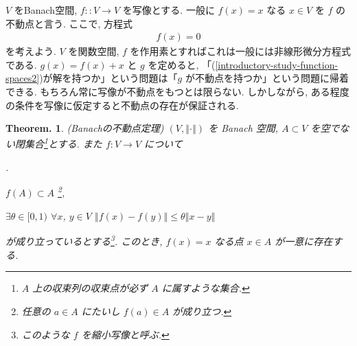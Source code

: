 \documentclass[openany, a4paper, oneside]{jsbook}
\newcounter{enum2}
\renewenvironment{enumerate}{%
\begin{list}%
{%
\arabic{enum2}.\ \,%
}%
{%
\usecounter{enum2}
\setlength{\itemindent}{0pt}%
\setlength{\leftmargin}{15pt}%
\setlength{\rightmargin}{0pt}%
\setlength{\labelsep}{0pt}%
\setlength{\labelwidth}{6pt}%
\setlength{\itemsep}{0pt}%
\setlength{\parsep}{0pt}%
\setlength{\listparindent}{0pt}%
}
}{%
\end{list}%
}
\theoremstyle{break}
\theoremstyle{breakdefn}
\newtheorem{thm}{Theorem.}[section]
\newcommand{\norm}[1]{\left\Vert#1\right\Vert}
\begin{document}
$V$ をBanach空間, $f \colon :V \to V$ を写像とする.
一般に $f(x)=x$ なる $x\in V$ を $f$ の不動点と言う.
ここで, 方程式
\begin{align}
 f(x)=0 \label{introductory-study-function-spaces2}
\end{align}
を考えよう.
$V$ を関数空間, $f$ を作用素とすればこれは一般には非線形微分方程式である.
$g(x) = f(x) + x$ と $g$ を定めると, 「(\ref{introductory-study-function-spaces2})が解を持つか」という問題は「$g$ が不動点を持つか」という問題に帰着できる.
もちろん常に写像が不動点をもつとは限らない.
しかしながら, ある程度の条件を写像に仮定すると不動点の存在が保証される.
\begin{thm}(Banachの不動点定理)
 $(V, \norm{\cdot})$ を Banach 空間, $A \subset V$ を空でない閉集合\footnote{$A$ 上の収束列の収束点が必ず $A$ に属すような集合.}とする.
 また $f \colon V\to V$ について
\begin{enumerate}
\item $f(A) \subset A$ \footnote{任意の $a\in A$ にたいし $f(a)\in A$ が成り立つ.},
\item $\exists \theta \in[0, 1)$ $\forall x$, $y \in V$ $\norm{f(x)-f(y)} \leq \theta \norm{x - y}$
\end{enumerate}
 が成り立っているとする\footnote{このような $f$ を縮小写像と呼ぶ.}.
 このとき, $f(x) = x$ なる点 $x \in A$ が一意に存在する.
\end{thm}
\end{document}
